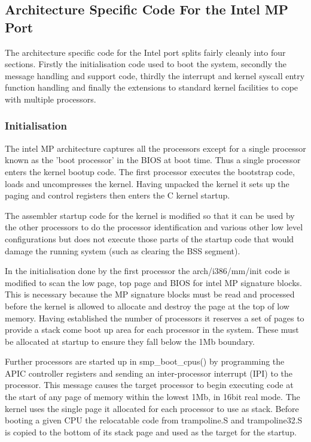 \documentclass[]{article}
\begin{document}
\subsection{Architecture Specific Code For the Intel MP Port}
The architecture specific code for the Intel port splits fairly cleanly 
into four sections. Firstly the initialisation code used to boot the 
system, secondly the message handling and support code, thirdly the 
interrupt and kernel syscall entry function handling and finally the 
extensions to standard kernel facilities to cope with multiple processors.

\subsubsection{Initialisation}	
The intel MP architecture captures all the processors except for a single 
processor known as the 'boot processor' in the BIOS at boot time. Thus a 
single processor enters the kernel bootup code. The first processor 
executes the bootstrap code, loads and uncompresses the kernel. Having 
unpacked the kernel it sets up the paging and control registers then enters 
the C kernel startup.

The assembler startup code for the kernel is modified so that it can be 
used by the other processors to do the processor identification and various 
other low level configurations but does not execute those parts of the 
startup code that would damage the running system (such as clearing the BSS 
segment). 

In the initialisation done by the first processor the arch/i386/mm/init 
code is modified to scan the low page, top page and BIOS for intel MP 
signature blocks. This is necessary because the MP signature blocks must 
be read and processed before the kernel is allowed to allocate and destroy 
the page at the top of low memory. Having established the number of 
processors it reserves a set of pages to provide a stack come boot up area 
for each processor in the system. These must be allocated at startup to 
ensure they fall below the 1Mb boundary.

Further processors are started up in smp\_boot\_cpus() by programming the 
APIC controller registers and sending an inter-processor interrupt (IPI) to 
the processor. This message causes the target processor to begin executing 
code at the start of any page of memory within the lowest 1Mb, in 16bit 
real mode. The kernel uses the single page it allocated for each processor 
to use as stack. Before booting a given CPU the relocatable code from 
trampoline.S and trampoline32.S is copied to the bottom of its stack page 
and used as the target for the startup. 
\end{document}
